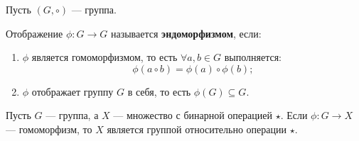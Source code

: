 \begin{shdef}
    \begin{definition}[Эндоморфизм]
        Пусть \( (G, \circ) \) — группа. 
        
        Отображение \( \phi: G \to G \) называется \textbf{эндоморфизмом}, если:
        \begin{enumerate}
            \item \( \phi \) является гомоморфизмом, то есть \(\forall a, b \in G \) выполняется:
                  \[
                  \phi(a \circ b) = \phi(a) \circ \phi(b);
                  \]
            \item \( \phi \) отображает группу \( G \) в себя, то есть \( \phi(G) \subseteq G \).
        \end{enumerate}
    \end{definition}
\end{shdef}

\begin{shth}
    \begin{theorem}
        Пусть \( G \) — группа, а \( X \) — множество с бинарной операцией \( \star \). Если \( \phi: G \to X \) — гомоморфизм, то \( X \) является группой относительно операции \( \star \).
    \end{theorem}
\end{shth}

